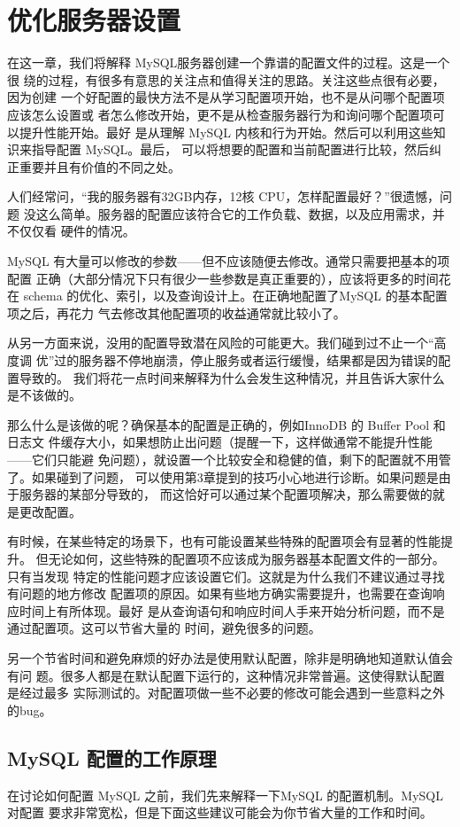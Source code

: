 \chapter{优化服务器设置}
在这一章，我们将解释 MySQL服务器创建一个靠谱的配置文件的过程。这是一个很
绕的过程，有很多有意思的关注点和值得关注的思路。关注这些点很有必要，因为创建
一个好配置的最快方法不是从学习配置项开始，也不是从问哪个配置项应该怎么设置或
者怎么修改开始，更不是从检查服务器行为和询问哪个配置项可以提升性能开始。最好
是从理解 MySQL 内核和行为开始。然后可以利用这些知识来指导配置 MySQL。最后，
可以将想要的配置和当前配置进行比较，然后纠正重要并且有价值的不同之处。

人们经常问，“我的服务器有32GB内存，12核 CPU，怎样配置最好？”很遗憾，问题
没这么简单。服务器的配置应该符合它的工作负载、数据，以及应用需求，并不仅仅看
硬件的情况。

MySQL 有大量可以修改的参数——但不应该随便去修改。通常只需要把基本的项配置
正确（大部分情况下只有很少一些参数是真正重要的），应该将更多的时间花在 schema
的优化、索引，以及查询设计上。在正确地配置了MySQL 的基本配置项之后，再花力
气去修改其他配置项的收益通常就比较小了。

从另一方面来说，没用的配置导致潜在风险的可能更大。我们碰到过不止一个“高度调
优”过的服务器不停地崩溃，停止服务或者运行缓慢，结果都是因为错误的配置导致的。
我们将花一点时间来解释为什么会发生这种情况，并且告诉大家什么是不该做的。

那么什么是该做的呢？确保基本的配置是正确的，例如InnoDB 的 Buffer Pool 和日志文
件缓存大小，如果想防止出问题（提醒一下，这样做通常不能提升性能——它们只能避
免问题），就设置一个比较安全和稳健的值，剩下的配置就不用管了。如果碰到了问题，
可以使用第3章提到的技巧小心地进行诊断。如果问题是由于服务器的某部分导致的，
而这恰好可以通过某个配置项解决，那么需要做的就是更改配置。

有时候，在某些特定的场景下，也有可能设置某些特殊的配置项会有显著的性能提升。
但无论如何，这些特殊的配置项不应该成为服务器基本配置文件的一部分。只有当发现
特定的性能问题才应该设置它们。这就是为什么我们不建议通过寻找有问题的地方修改
配置项的原因。如果有些地方确实需要提升，也需要在查询响应时间上有所体现。最好
是从查询语句和响应时间人手来开始分析问题，而不是通过配置项。这可以节省大量的
时间，避免很多的问题。

另一个节省时间和避免麻烦的好办法是使用默认配置，除非是明确地知道默认值会有问
题。很多人都是在默认配置下运行的，这种情况非常普遍。这使得默认配置是经过最多
实际测试的。对配置项做一些不必要的修改可能会遇到一些意料之外的bug。

\section{MySQL 配置的工作原理}
在讨论如何配置 MySQL 之前，我们先来解释一下MySQL 的配置机制。MySQL 对配置
要求非常宽松，但是下面这些建议可能会为你节省大量的工作和时间。

